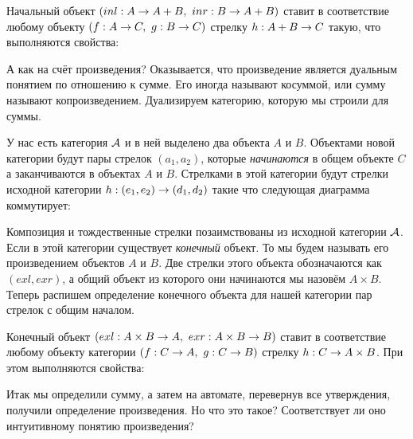 Начальный объект $(inl : A \rightarrow A+B,\ inr : B \rightarrow A+B)$ ставит в
соответствие любому объекту $(f : A \rightarrow C,\ g : B \rightarrow C)$ стрелку
$h : A+B \rightarrow C$ такую, что выполняются свойства:

\begin{centering}



\end{centering}

А как на счёт произведения? Оказывается, что произведение является
дуальным понятием по отношению к сумме. Его иногда называют косуммой,
или сумму называют копроизведением. Дуализируем категорию, которую мы
строили для суммы.

У нас есть категория $\mathcal{A}$ и в ней выделено два объекта $A$ и $B$.
Объектами новой категории будут пары стрелок $(a_1,a_2)$, которые
\emph{начинаются} в общем объекте $C$ а заканчиваются в объектах $A$ и
$B$. Стрелками в этой категории будут стрелки исходной категории
$h : (e_1,e_2) \rightarrow (d_1,d_2)$ такие что следующая диаграмма коммутирует:

\begin{centering}



\end{centering}

Композиция и тождественные стрелки позаимствованы из исходной категории
$\mathcal{A}$. Если в этой категории существует \emph{конечный} объект. То мы
будем называть его произведением объектов $A$ и $B$. Две стрелки этого
объекта обозначаются как $(exl,exr)$, а общий объект из которого они
начинаются мы назовём $A\times B$. Теперь распишем определение конечного
объекта для нашей категории пар стрелок с общим началом.

Конечный объект $(exl : A \times B \Ra A, \ exr : A \times B \Ra B)$
ставит в соответствие любому объекту категории
$(f : C \rightarrow A,\ g : C \rightarrow B)$ стрелку $h : C \rightarrow A \times B$. При этом
выполняются свойства:

\begin{centering}



\end{centering}

Итак мы определили сумму, а затем на автомате, перевернув все
утверждения, получили определение произведения. Но что это такое?
Соответствует ли оно интуитивному понятию произведения?

